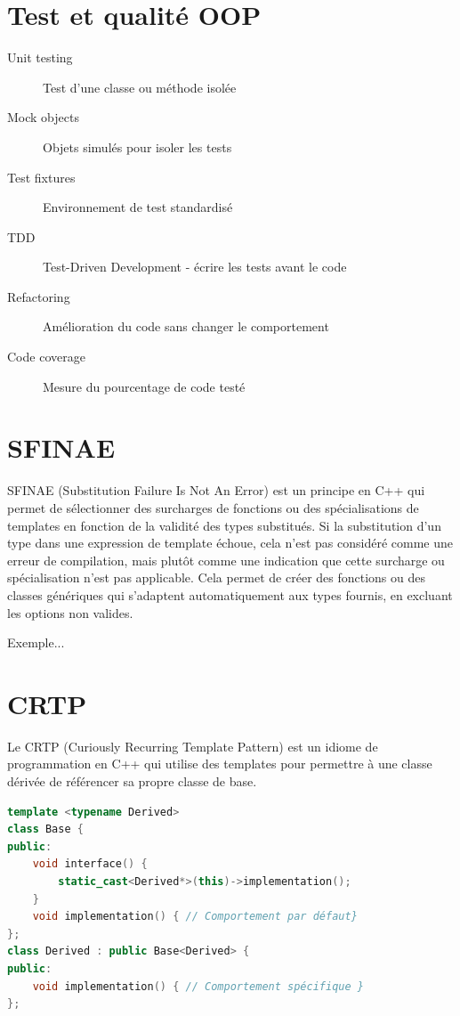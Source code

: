 \documentclass{article}
\begin{document}
\begin{multicols*}{3}
\section*{Test et qualité OOP}
\begin{description}
\item[Unit testing] Test d'une classe ou méthode isolée
\item[Mock objects] Objets simulés pour isoler les tests
\item[Test fixtures] Environnement de test standardisé
\item[TDD] Test-Driven Development - écrire les tests avant le code
\item[Refactoring] Amélioration du code sans changer le comportement
\item[Code coverage] Mesure du pourcentage de code testé
\end{description}

\section*{SFINAE}
SFINAE (Substitution Failure Is Not An Error) est un principe en C++ qui permet de sélectionner des surcharges de fonctions ou des spécialisations de templates en fonction de la validité des types substitués. Si la substitution d'un type dans une expression de template échoue, cela n'est pas considéré comme une erreur de compilation, mais plutôt comme une indication que cette surcharge ou spécialisation n'est pas applicable. Cela permet de créer des fonctions ou des classes génériques qui s'adaptent automatiquement aux types fournis, en excluant les options non valides.

Exemple...

\section*{CRTP}
Le CRTP (Curiously Recurring Template Pattern) est un idiome de programmation en C++ qui utilise des templates pour permettre à une classe dérivée de référencer sa propre classe de base.

\begin{lstlisting}[language=C++]
template <typename Derived>
class Base {
public:
    void interface() {
        static_cast<Derived*>(this)->implementation();
    }
    void implementation() { // Comportement par défaut}
};
class Derived : public Base<Derived> {
public:
    void implementation() { // Comportement spécifique }
};
\end{lstlisting}


\end{multicols*}
\end{document}
